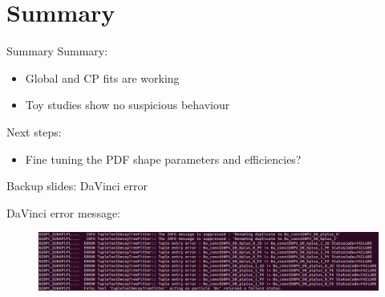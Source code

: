 \documentclass{beamer}
\begin{document}
\section{Summary}
\begin{frame}{Summary}
  Summary:
  \begin{itemize}
    \item{Global and CP fits are working}
    \item{Toy studies show no suspicious behaviour}
  \end{itemize}
  Next steps:
  \begin{itemize}
    \item{Fine tuning the PDF shape parameters and efficiencies?}
  \end{itemize}
\end{frame}

\begin{frame}{Backup slides: DaVinci error}
  \begin{center}
    DaVinci error message:
  \end{center}
  \begin{figure}
    \includegraphics[width = 1\textwidth]{DaVinciError.png}
  \end{figure}
\end{frame}
\end{document}
